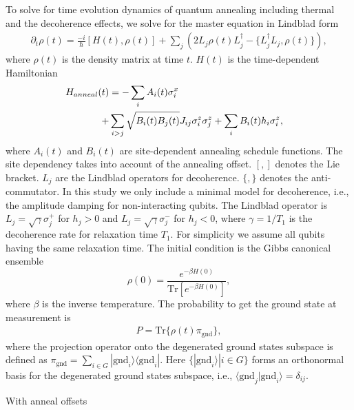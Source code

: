 \documentclass[prd,twocolumn,tightenlines,preprintnumbers,showpacs,superscriptaddress,notitlepage,nofootinbib,eqsecnum,floatfix,longbibliography]{revtex4}
\begin{document}
{\color{blue}


To solve for time evolution dynamics of quantum annealing including thermal and the decoherence effects, we solve for the master equation in Lindblad form
\begin{align}
    \partial_t \rho (t) =  \frac{-i}{\hbar} [H(t) , \rho(t)] + \sum_j (2L_j \rho(t) L_j^\dagger - \{ L^\dagger_j L_j, \rho(t) \}) ,
\end{align}
where $\rho (t)$ is the density matrix at time $t$.
$H(t)$ is the time-dependent Hamiltonian
\begin{align}
    \label{eq:annealH}
     H_{anneal}(t)&  =  - \sum_i  A_i(t)\sigma^x_i & \notag \\
     +&  \sum_{i>j} \sqrt{B_{i}(t)B_{j}(t)} J_{ij} \sigma^z_i \sigma^z_j +\sum_i B_{i}(t) h_i \sigma^z_i  ,&
\end{align}
where $A_i(t)$ and $B_{i}(t)$ are site-dependent annealing schedule functions.
The site dependency takes into account of the annealing offset.
$[,]$ denotes the Lie bracket.
$L_j$ are the Lindblad operators for decoherence.
$\{, \}$ denotes the anti-commutator.
In this study we only include a minimal model for decoherence, i.e., the amplitude damping for non-interacting qubits.
The Lindblad operator is $L_j=\sqrt{\gamma} \sigma^{+}_j$ for $h_j>0$ and $L_j=\sqrt{\gamma} \sigma^{-}_j$ for $h_j<0$, where $\gamma = 1/T_1$ is the decoherence rate for relaxation time $T_1$.
For simplicity we assume all qubits having the same relaxation time.
The initial condition is the Gibbs canonical ensemble
\begin{equation}
    \rho (0) =  \frac{e^{-\beta H(0)}}{\mbox{Tr}[e^{-\beta H(0)}]} ,
\end{equation}
where $\beta$ is the inverse temperature.
The probability to get the ground state at measurement is
\begin{align}
    P =  \mbox{Tr} \{  \rho (t) \pi_{\mbox{gnd}} \}  ,
\end{align}
where the projection operator onto the degenerated ground states subspace is defined as $\pi_{\mbox{gnd}}=\sum_{i\in G} |\mbox{gnd}_i\rangle \langle \mbox{gnd}_i| $.
Here $\{ | \mbox{gnd}_i \rangle | i \in G \}$ forms an orthonormal basis for the degenerated ground states subspace, i.e., $\langle \mbox{gnd}_j | \mbox{gnd}_i \rangle = \delta_{ij}$.





}

With anneal offsets
\end{document}
